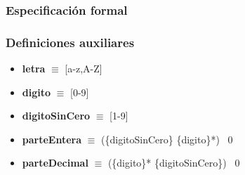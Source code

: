 \documentclass[11pt]{article}
\begin{document}
    \subsubsection{Especificación formal}
        \subsubsection*{Definiciones auxiliares}
        \begin{itemize}
            \item \textbf{letra }$\equiv$ [a-z,A-Z]
            \item \textbf{digito }$\equiv$ [0-9]
            \item \textbf{digitoSinCero }$\equiv$ [1-9]
            \item \textbf{parteEntera }$\equiv$ (\{digitoSinCero\} \{digito\}*) \textbar\ 0
            \item \textbf{parteDecimal }$\equiv$ (\{digito\}* \{digitoSinCero\}) \textbar\ 0
        \end{itemize}
\end{document}
